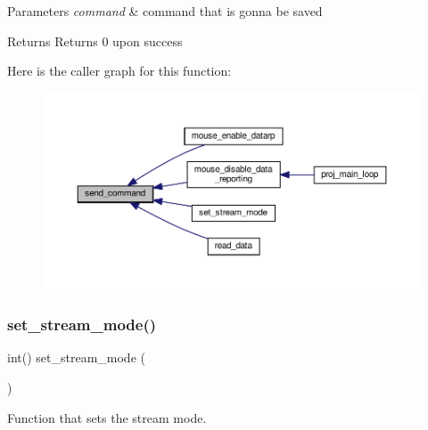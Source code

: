 \begin{DoxyParams}{Parameters}
{\em command} & command that is gonna be saved\\
\hline
\end{DoxyParams}
\begin{DoxyReturn}{Returns}
Returns 0 upon success 
\end{DoxyReturn}
Here is the caller graph for this function\+:
\nopagebreak
\begin{figure}[H]
\begin{center}
\leavevmode
\includegraphics[width=350pt]{group__mouse_ga926121b9c6d89ac8825f115e3eb8dac3_icgraph}
\end{center}
\end{figure}
\mbox{\label{group__mouse_ga58c043049bb31ec7bad65594a8341a5d}} 
\subsubsection{\texorpdfstring{set\+\_\+stream\+\_\+mode()}{set\_stream\_mode()}}
{\footnotesize\ttfamily int() set\+\_\+stream\+\_\+mode (\begin{DoxyParamCaption}{ }\end{DoxyParamCaption})}



Function that sets the stream mode. 


